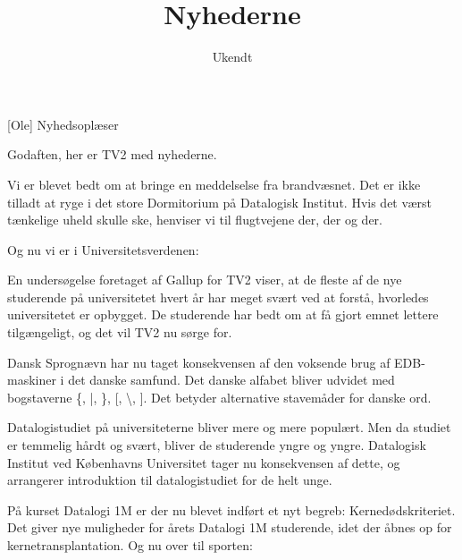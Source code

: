 \documentclass[a4paper,11pt]{article}
\title{Nyhederne}
\author{Ukendt}
\begin{document}
\maketitle

\begin{roles}
[Ole] Nyhedsoplæser
\end{roles}

\begin{sketch}

     Godaften, her er TV2 med nyhederne. 

     Vi er blevet bedt om at bringe en meddelselse fra brandvæsnet.
             Det er ikke tilladt at ryge i det store Dormitorium på Datalogisk Institut.
             Hvis det værst tænkelige uheld skulle ske, henviser vi til flugtvejene der, der og der. 

     Og nu vi er i Universitetsverdenen:

             En undersøgelse foretaget af Gallup for TV2 viser, at de fleste af de nye studerende på universitetet hvert år har meget
             svært ved at forstå, hvorledes universitetet er opbygget. De studerende har bedt om at få gjort emnet lettere tilgængeligt,
             og det vil TV2 nu sørge for.


     Dansk Sprognævn har nu taget konsekvensen af den voksende brug af EDB-maskiner i det danske samfund.
             Det danske alfabet bliver udvidet med bogstaverne \{, |, \}, [, \textbackslash, ]. 
             Det betyder alternative stavemåder for danske ord. \act{Overhead med "Majon\}se", "Jeppe [kj\}r elsker |llebr|d"}

     Datalogistudiet på universiteterne bliver mere og mere populært. Men da studiet er temmelig hårdt og svært, bliver
             de studerende yngre og yngre. Datalogisk Institut ved Københavns Universitet tager nu konsekvensen af dette, og
             arrangerer introduktion til datalogistudiet for de helt unge.


     På kurset Datalogi 1M er der nu blevet indført et nyt begreb: Kernedødskriteriet.
             Det giver nye muligheder for årets Datalogi 1M studerende, idet der åbnes op for kernetransplantation. Og nu over til sporten:


\end{sketch}
\end{document}
